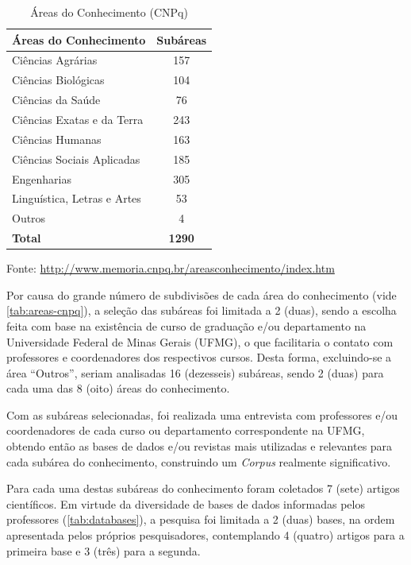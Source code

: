 \begin{table}[h!]
    \caption{Áreas do Conhecimento (CNPq)}
    \begin{center}
        \begin{tabular}{|l|c|}
            \hline 
            \textbf{Áreas do Conhecimento} & \textbf{Subáreas} \\ 
            \hline 
            Ciências Agrárias & 157 \\
            Ciências Biológicas & 104 \\
            Ciências da Saúde & 76 \\
            Ciências Exatas e da Terra & 243 \\
            Ciências Humanas & 163 \\
            Ciências Sociais Aplicadas & 185 \\
            Engenharias & 305 \\
            Linguística, Letras e Artes & 53 \\
            Outros & 4 \\
            \hline
            \textbf{Total} & \textbf{1290} \\
            \hline
        \end{tabular}
    \end{center}
    \center\footnotesize{Fonte: \url{http://www.memoria.cnpq.br/areasconhecimento/index.htm}}
    \label{tab:areas-cnpq}
\end{table}

Por causa do grande número de subdivisões de cada área do conhecimento (vide \autoref{tab:areas-cnpq}), a seleção das subáreas foi limitada a 2 (duas), sendo a escolha feita com base na existência de curso de graduação e/ou departamento na Universidade Federal de Minas Gerais (UFMG), o que facilitaria o contato com professores e coordenadores dos respectivos cursos. Desta forma, excluindo-se a área ``Outros'', seriam analisadas 16 (dezesseis) subáreas, sendo 2 (duas) para cada uma das 8 (oito) áreas do conhecimento.

Com as subáreas selecionadas, foi realizada uma entrevista com professores e/ou coordenadores de cada curso ou departamento correspondente na UFMG, obtendo então as bases de dados e/ou revistas mais utilizadas e relevantes para cada subárea do conhecimento, construindo um \emph{Corpus} realmente significativo.

Para cada uma destas subáreas do conhecimento foram coletados 7 (sete) artigos científicos. Em virtude da diversidade de bases de dados informadas pelos professores (\autoref{tab:databases}), a pesquisa foi limitada a 2 (duas) bases, na ordem apresentada pelos próprios pesquisadores, contemplando 4 (quatro) artigos para a primeira base e 3 (três) para a segunda. 

